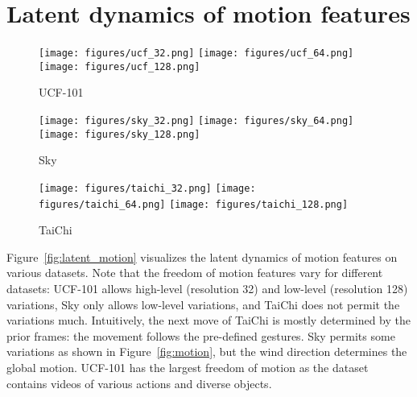\documentclass{article} \usepackage{iclr2022_conference,times}
\begin{document}
 
\clearpage
\section{Latent dynamics of motion features}
\label{appen:motion}

\begin{figure*}[h]
\centering\small
\begin{subfigure}{\textwidth}
\texttt{[image: figures/ucf\_32.png]}
\texttt{[image: figures/ucf\_64.png]}
\texttt{[image: figures/ucf\_128.png]}
\caption{UCF-101}
\end{subfigure}
\begin{subfigure}{\textwidth}
\texttt{[image: figures/sky\_32.png]}
\texttt{[image: figures/sky\_64.png]}
\texttt{[image: figures/sky\_128.png]}
\caption{Sky}
\end{subfigure}
\begin{subfigure}{\textwidth}
\texttt{[image: figures/taichi\_32.png]}
\texttt{[image: figures/taichi\_64.png]}
\texttt{[image: figures/taichi\_128.png]}
\caption{TaiChi}
\end{subfigure}
\caption{
Latent trajectories of the motion features on UCF-101, Sky, and TaiChi datasets. Resolution denotes the location of motion features injected into the progressive generator; lower-resolution controls the high-level semantics, and higher-resolution controls the low-level variations. Dot colors gradually changes from blue () to red (), and 5 random motion vectors are sampled. The features are projected onto 2D space via principal component analysis (PCA) for visualization.
}\label{fig:latent_motion}
\end{figure*}

Figure~\ref{fig:latent_motion} visualizes the latent dynamics of motion features on various datasets. Note that the freedom of motion features vary for different datasets: UCF-101 allows high-level (resolution 32) and low-level (resolution 128) variations, Sky only allows low-level variations, and TaiChi does not permit the variations much.
Intuitively, the next move of TaiChi is mostly determined by the prior frames: the movement follows the pre-defined gestures. Sky permits some variations as shown in Figure~\ref{fig:motion}, but the wind direction determines the global motion. UCF-101 has the largest freedom of motion as the dataset contains videos of various actions and diverse objects.
\end{document}
